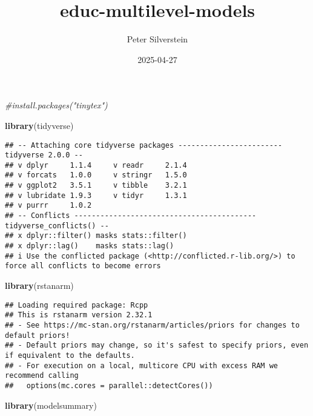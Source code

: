\documentclass[
]{article}
\title{educ-multilevel-models}
\author{Peter Silverstein}
\date{2025-04-27}
\newenvironment{Shaded}{\begin{snugshade}}{\end{snugshade}}
\newcommand{\CommentTok}[1]{\textcolor[rgb]{0.56,0.35,0.01}{\textit{#1}}}
\newcommand{\FunctionTok}[1]{\textcolor[rgb]{0.13,0.29,0.53}{\textbf{#1}}}
\newcommand{\NormalTok}[1]{#1}
\begin{document}
\maketitle

\begin{Shaded}
\begin{Highlighting}[]
\CommentTok{\#install.packages("tinytex")}
\end{Highlighting}
\end{Shaded}

\begin{Shaded}
\begin{Highlighting}[]
\FunctionTok{library}\NormalTok{(tidyverse)}
\end{Highlighting}
\end{Shaded}

\begin{verbatim}
## -- Attaching core tidyverse packages ------------------------ tidyverse 2.0.0 --
## v dplyr     1.1.4     v readr     2.1.4
## v forcats   1.0.0     v stringr   1.5.0
## v ggplot2   3.5.1     v tibble    3.2.1
## v lubridate 1.9.3     v tidyr     1.3.1
## v purrr     1.0.2     
## -- Conflicts ------------------------------------------ tidyverse_conflicts() --
## x dplyr::filter() masks stats::filter()
## x dplyr::lag()    masks stats::lag()
## i Use the conflicted package (<http://conflicted.r-lib.org/>) to force all conflicts to become errors
\end{verbatim}

\begin{Shaded}
\begin{Highlighting}[]
\FunctionTok{library}\NormalTok{(rstanarm)}
\end{Highlighting}
\end{Shaded}

\begin{verbatim}
## Loading required package: Rcpp
## This is rstanarm version 2.32.1
## - See https://mc-stan.org/rstanarm/articles/priors for changes to default priors!
## - Default priors may change, so it's safest to specify priors, even if equivalent to the defaults.
## - For execution on a local, multicore CPU with excess RAM we recommend calling
##   options(mc.cores = parallel::detectCores())
\end{verbatim}

\begin{Shaded}
\begin{Highlighting}[]
\FunctionTok{library}\NormalTok{(modelsummary)}
\end{Highlighting}
\end{Shaded}
\end{document}
